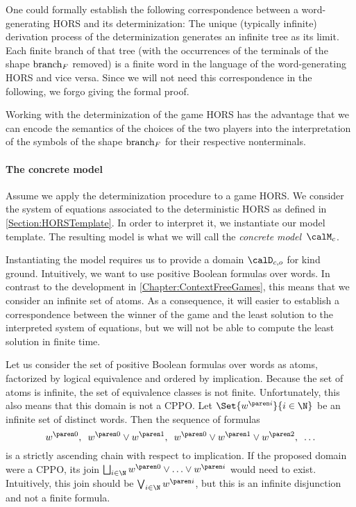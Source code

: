 \documentclass[../../diss.tex]{subfiles}
\begin{document}
One could formally establish the following correspondence between a word-generating HORS and its determinization:
The unique (typically infinite) derivation process of the determinization generates an infinite tree as its limit.
Each finite branch of that tree (with the occurrences of the terminals of the shape $\text{branch}_F$ removed) is a finite word in the language of the word-generating HORS and vice versa.
Since we will not need this correspondence in the following, we forgo giving the formal proof.

Working with the determinization of the game HORS has the advantage that we can encode the semantics of the choices of the two  players into the interpretation of the symbols of the shape $\text{branch}_F$ for their respective nonterminals.

\paragraph{The concrete model}

Assume we apply the determinization procedure to a game HORS.\@
We consider the system of equations associated to the deterministic HORS as defined in \cref{Section:HORSTemplate}.
In order to interpret it, we instantiate our model template.
The resulting model is what we will call the \emph{concrete model}~$\modelc$.

Instantiating the model requires us to provide a domain $\domainc{\ground}$ for kind ground.
Intuitively, we want to use positive Boolean formulas over words.
In contrast to the development in \cref{Chapter:ContextFreeGames}, this means that we consider an infinite set of atoms.
As a consequence, it will easier to establish a correspondence between the winner of the game and the least solution to the interpreted system of equations, but we will not be able to compute the least solution in finite time.

Let us consider the set of positive Boolean formulas over words as atoms, factorized by logical equivalence and ordered by implication.
Because the set of atoms is infinite, the set of equivalence classes is not finite.
Unfortunately, this also means that this domain is not a CPPO.\@
Let $\Set{ \itr{w}{i} }{i \in \N}$ be an infinite set of distinct words.
Then the sequence of formulas
\[
    \itr{w}{0},
    \enspace
    \itr{w}{0} \vee \itr{w}{1},
    \enspace
    \itr{w}{0} \vee \itr{w}{1} \vee \itr{w}{2},
    \enspace
    \ldots
\]
is a strictly ascending chain with respect to implication.
If the proposed domain were a CPPO, its join $\bigsqcup_{i \in \N} \itr{w}{0} \vee \ldots \vee \itr{w}{i}$ would need to exist.
Intuitively, this join should be $\bigvee_{i \in \N} \itr{w}{i}$, but this is an infinite disjunction and not a finite formula.
\end{document}
